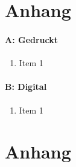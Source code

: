 \chapter*{Anhang}
\subsubsection{A: Gedruckt}
\begin{enumerate}
	\item Item 1
\end{enumerate}

\subsubsection{B: Digital}
\begin{enumerate}
	\item Item 1
\end{enumerate}
\chapter{Anhang}
